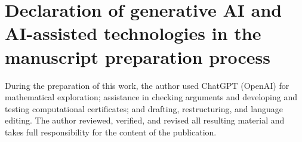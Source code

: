 \documentclass[11pt]{article}
\theoremstyle{definition}
\begin{document}
\section*{Declaration of generative AI and AI-assisted technologies in the manuscript preparation process}

During the preparation of this work, the author used ChatGPT (OpenAI) for mathematical exploration; assistance in checking arguments and developing and testing computational certificates; and drafting, restructuring, and language editing.  The author reviewed, verified, and revised all resulting material and takes full responsibility for the content of the publication.


\begingroup
\small

\endgroup
\end{document}
